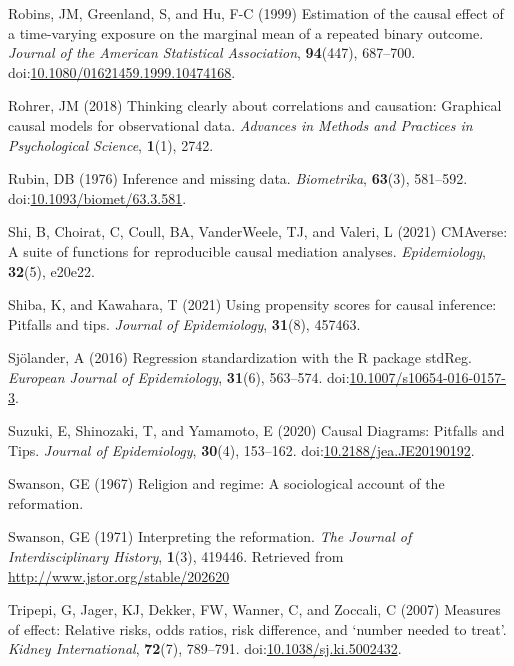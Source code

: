 \documentclass[
  singlecolumn,
  9pt]{article}
\newlength{\cslhangindent}
\newenvironment{CSLReferences}[2] %
 {\begin{list}{}{%
  \setlength{\itemindent}{0pt}
  \setlength{\leftmargin}{0pt}
  \setlength{\parsep}{0pt}
  \ifodd #1
   \setlength{\leftmargin}{\cslhangindent}
   \setlength{\itemindent}{-1\cslhangindent}
  \fi
  \setlength{\itemsep}{#2\baselineskip}}}
 {\end{list}}
\begin{document}
\begin{CSLReferences}{1}{0}
Robins, JM, Greenland, S, and Hu, F-C (1999) Estimation of the causal
effect of a time-varying exposure on the marginal mean of a repeated
binary outcome. \emph{Journal of the American Statistical Association},
\textbf{94}(447), 687--700.
doi:\href{https://doi.org/10.1080/01621459.1999.10474168}{10.1080/01621459.1999.10474168}.

Rohrer, JM (2018) Thinking clearly about correlations and causation:
Graphical causal models for observational data. \emph{Advances in
Methods and Practices in Psychological Science}, \textbf{1}(1), 2742.

Rubin, DB (1976) Inference and missing data. \emph{Biometrika},
\textbf{63}(3), 581--592.
doi:\href{https://doi.org/10.1093/biomet/63.3.581}{10.1093/biomet/63.3.581}.

Shi, B, Choirat, C, Coull, BA, VanderWeele, TJ, and Valeri, L (2021)
CMAverse: A suite of functions for reproducible causal mediation
analyses. \emph{Epidemiology}, \textbf{32}(5), e20e22.

Shiba, K, and Kawahara, T (2021) Using propensity scores for causal
inference: Pitfalls and tips. \emph{Journal of Epidemiology},
\textbf{31}(8), 457463.

Sjölander, A (2016) Regression standardization with the R package
stdReg. \emph{European Journal of Epidemiology}, \textbf{31}(6),
563--574.
doi:\href{https://doi.org/10.1007/s10654-016-0157-3}{10.1007/s10654-016-0157-3}.

Suzuki, E, Shinozaki, T, and Yamamoto, E (2020) Causal Diagrams:
Pitfalls and Tips. \emph{Journal of Epidemiology}, \textbf{30}(4),
153--162.
doi:\href{https://doi.org/10.2188/jea.JE20190192}{10.2188/jea.JE20190192}.

Swanson, GE (1967) Religion and regime: A sociological account of the
reformation.

Swanson, GE (1971) Interpreting the reformation. \emph{The Journal of
Interdisciplinary History}, \textbf{1}(3), 419446. Retrieved from
\url{http://www.jstor.org/stable/202620}

Tripepi, G, Jager, KJ, Dekker, FW, Wanner, C, and Zoccali, C (2007)
Measures of effect: Relative risks, odds ratios, risk difference, and
{`}number needed to treat{'}. \emph{Kidney International},
\textbf{72}(7), 789--791.
doi:\href{https://doi.org/10.1038/sj.ki.5002432}{10.1038/sj.ki.5002432}.


\end{CSLReferences}
\end{document}
